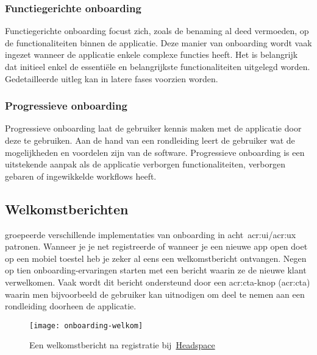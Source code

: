 \subsubsection{Functiegerichte onboarding}
\label{sec:onboarding:types:functie}

Functiegerichte onboarding focust zich, zoals de benaming al deed vermoeden, op de functionaliteiten binnen de applicatie. Deze manier van onboarding wordt vaak ingezet wanneer de applicatie enkele complexe functies heeft. Het is belangrijk dat initieel enkel de essentiële en belangrijkste functionaliteiten uitgelegd worden. Gedetailleerde uitleg kan in latere fases voorzien worden.

\subsubsection{Progressieve onboarding}
\label{sec:onboarding:types:progressief}

Progressieve onboarding laat de gebruiker kennis maken met de applicatie door deze te gebruiken. Aan de hand van een rondleiding leert de gebruiker wat de mogelijkheden en voordelen zijn van de software. Progressieve onboarding is een uitstekende aanpak als de applicatie verborgen functionaliteiten, verborgen gebaren of ingewikkelde workflows heeft.

\subsection{Welkomstberichten}
\label{sec:onboarding:welkomstberichten}

\textcite{Balboni2018} groepeerde verschillende implementaties van onboarding in acht~\acrshort{acr:ui}/\acrshort{acr:ux} patronen. Wanneer je je net registreerde of wanneer je een nieuwe app open doet op een mobiel toestel heb je zeker al eens een welkomstbericht ontvangen. Negen op tien onboarding-ervaringen starten met een bericht waarin ze de nieuwe klant verwelkomen. Vaak wordt dit bericht ondersteund door een \acrshort{acr:cta}-knop (\acrlong{acr:cta}) waarin men bijvoorbeeld de gebruiker kan uitnodigen om deel te nemen aan een rondleiding doorheen de applicatie.

\begin{figure}[h!]
    \centering
    \texttt{[image: onboarding-welkom]}
    \caption[Voorbeeld welkomstbericht]{Een welkomstbericht na registratie bij~\href{https://www.headspace.com/}{Headspace}}
    \label{fig:onboarding:welkom}
\end{figure}

